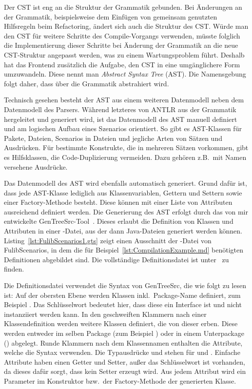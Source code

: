 Der CST ist eng an die Struktur der Grammatik gebunden.
Bei Änderungen an der Grammatik, beispielsweise dem Einfügen von gemeinsam genutzten Hilfsregeln beim Refactoring, ändert sich auch die Struktur des CST\@.
Würde man den CST für weitere Schritte des Compile-Vorgangs verwenden, müsste folglich die Implementierung dieser Schritte bei Änderung der Grammatik an die neue CST-Struktur angepasst werden, was zu einem Wartungsproblem führt.
Deshalb hat das Frontend zusätzlich die Aufgabe, den CST in eine umgänglichere Form umzuwandeln.
Diese nennt man \emph{Abstract Syntax Tree} (AST).
Die Namensgebung folgt daher, dass über die Grammatik abstrahiert wird.

Technisch gesehen besteht der AST aus einem weiteren Datenmodell neben dem Datenmodell des Parsers.
Während letzteres von ANTLR aus der Grammatik hergeleitet und generiert wird, ist das Datenmodell des AST manuell definiert und am logischen Aufbau eines Szenarios orientiert.
So gibt es AST-Klassen für Pakete, Dateien, Scenarios in Dateien und jegliche Arten von Sätzen und Ausdrücken.
Für bestimmte Konstrukte, die in mehreren Sätzen vorkommen, gibt es Hilfsklassen, die Code-Duplizierung vermeiden.
Dazu gehören z.B.\ mit Namen versehene Ausdrücke.

Das Datenmodell des AST wird ebenfalls automatisch generiert.
Grund dafür ist, dass jede AST-Klasse lediglich aus Klassenvariablen, Gettern und Settern sowie einer Factory-Methode besteht.
Diese können mit einer Liste von Attributen ausreichend definiert werden.
Die Generierung des AST erfolgt durch das von mir entwickelte GenTreeSrc-Tool~\cite{gentreesrc}.
Dieses erlaubt die Definition von Klassen und Attributen in einer -Datei, aus der dann Java-Dateien generiert werden können.
Listing~\ref{lst:FulibScenarios1.gts} zeigt einen Ausschnitt der -Datei von FulibScenarios, in dem die für Beispiel~\ref{lst:CompilationExample.md} benötigten Definitionen abgebildet sind.
Die vollständige Definitionsdatei ist unter~\cite{gts-definitions} zu finden.


Die Definitionsdatei verwendet die Syntax von GenTreeSrc, die wie folgt zu lesen ist:
Auf der obersten Ebene werden Klassen inkl.\ Package-Name definiert, zum Beispiel .
Das Schlüsselwort  bedeutet hier, dass diese ein Interface ist und nicht instanziiert werden kann.
In den geschweiften Klammern nach einer Klassendefinition werden weitere Klassen definiert, die von dieser erben.
Diese werden entweder im selben Package (zum Beispiel ) oder in einem Unterpackage () abgelegt.
Runde Klammern nach dem Klassennamen enthalten die Attribute, welche die Syntax  verwenden.
Die Typausdrücke \code{[T]} und \code{[T:U]} stehen für  und .
Einfache Attribute haben einen Getter und Setter, außer das Schlüsselwort  ist vorhanden, da dieses dafür sorgt, dass kein Setter erzeugt wird.
Aus jedem Attribut wird ein Parameter im Konstruktor bzw.\ der Factory-Methode der generierten Klasse.

